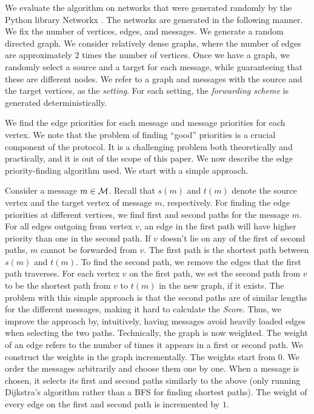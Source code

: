 \documentclass{sig-alternate-05-2015}[9pt]
\newcommand{\M}{{\cal M}}
\theoremstyle{definition}
\begin{document}
		We evaluate the algorithm on networks that were generated randomly by the Python library Networkx
		 \cite{HSS08}.
		The networks are generated in the following manner.
		We fix the number of vertices, edges, and messages.
		We generate a random directed graph.
		We consider relatively dense graphs, where the number of edges are approximately 2 times the number of vertices.
		Once we have a graph, we randomly select a source and a target for each message,
		while guaranteeing that these are different nodes.
		We refer to a graph and messages with the source and the target vertices, 
		as the {\em setting}.
		For each setting, the {\em forwarding scheme} is generated deterministically.

		We find the edge priorities for each message and message priorities for each vertex. We note that the problem of finding ``good'' priorities is a crucial component of the protocol. It is a challenging problem both theoretically and practically, and it is out of the scope of this paper. We now describe the edge priority-finding algorithm used. We start with a simple approach.

		Consider a message $m \in \M$. Recall that $s(m)$ and $t(m)$ denote the source vertex
		and the target vertex of message $m$, respectively. For finding the edge priorities at different vertices, we find first and second paths for the message $m$. For all edges outgoing from vertex $v$, an edge in the first path will have higher priority than one in the second path. If $v$ doesn't lie on any of the first of second paths, $m$ cannot be forwarded from $v$.
		The first path is the shortest path between $s(m)$ and $t(m)$.
		To find the second path, we remove the edges that the first path traverses.
		For each vertex $v$ on the first path,
		we set the second path from $v$ to be the shortest path from $v$ to $t(m)$ in the new graph, if it exists. 
		The problem with this simple approach is that the second paths are of similar lengths for the different messages, making it hard to calculate the {\em Score}. Thus, we improve the approach by, intuitively, having messages avoid heavily loaded edges when selecting the two paths. Technically, the graph is now weighted. The weight of an edge refers to the number of times it appears in a first or second path. We construct the weights in the graph incrementally. The weights start from $0$. We order the messages arbitrarily and choose them one by one. When a message is chosen, it selects its first and second paths similarly to the above (only running Dijkstra's algorithm rather than a BFS for finding shortest paths). The weight of every edge on the first and second path is incremented by $1$.
\end{document}
